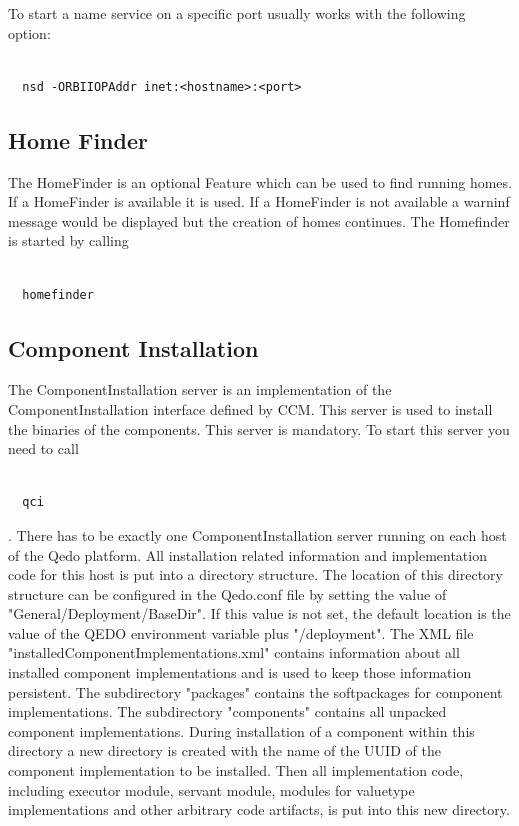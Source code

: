 \documentclass[12pt,a4paper]{report}
\begin{document}
To start a name service on a specific port usually works with the following option:

\small
\begin{verbatim}

  nsd -ORBIIOPAddr inet:<hostname>:<port>

\end{verbatim}
\normalsize

\subsection{Home Finder}
\label{sec:HomeFinder}

The HomeFinder is an optional Feature which can be used to find running homes. If a HomeFinder is available it is used. If a HomeFinder is not available a warninf message would be displayed but the creation of homes continues. The Homefinder is started by calling

\small
\begin{verbatim}

  homefinder

\end{verbatim}
\normalsize

\subsection{Component Installation}
\label{sec:ComponentInstallation}
The ComponentInstallation server is an implementation of the ComponentInstallation interface defined by CCM. This server is used to install the binaries of the components. This server is mandatory. To start this server you need to call

\small
\begin{verbatim}

  qci

\end{verbatim}
\normalsize

. There has to be exactly one ComponentInstallation server running on each host of the Qedo platform. All installation related information and implementation code for this host is put into a directory structure. The location of this directory structure can be configured in the Qedo.conf file by setting the value of "General/Deployment/BaseDir". If this value is not set, the default location is the value of the QEDO environment variable plus "/deployment". The XML file "installedComponentImplementations.xml" contains information about all installed component implementations and is used to keep those information persistent. The subdirectory "packages" contains the softpackages for component implementations. The subdirectory "components" contains all unpacked component implementations. During installation of a component within this directory a new directory is created with the name of the UUID of the component implementation to be installed. Then all implementation code, including executor module, servant module, modules for valuetype implementations and other arbitrary code artifacts, is put into this new directory.
\end{document}
